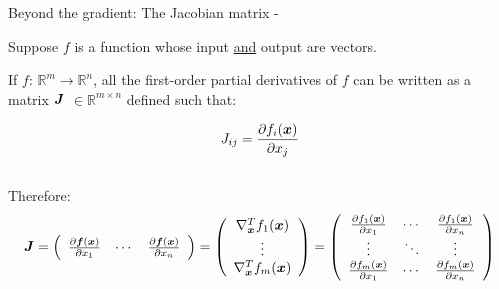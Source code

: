
\begin{frame}[t,allowframebreaks]{
    Beyond the gradient: The Jacobian matrix -}

    Suppose $f$ is a function 
    whose input \underline{and} output are vectors.\\
    \vspace{0.2cm}

    If $f$: $\mathbb{R}^m \rightarrow \mathbb{R}^n$,
    all the first-order partial derivatives of $f$ can be written 
    as a matrix $\boldsymbol{J}$ $\in \mathbb{R}^{m \times n}$
    defined such that:

    \begin{equation}
        J_{ij} = 
        \frac{\partial f_{i}(\boldsymbol{x})}{\partial x_j}
        \label{eq:jacobian_1}
    \end{equation}\\

    Therefore: 
    \begin{equation}
        \boldsymbol{J} = 
        \left(
            \begin{array}{ccc}
            \frac{\partial \boldsymbol{f}(\boldsymbol{x})}{\partial x_1} & 
            \cdots & 
            \frac{\partial \boldsymbol{f}(\boldsymbol{x})}{\partial x_n} \\ 
            \end{array}
        \right) =
        \left(
            \begin{array}{c}
            \nabla_{\boldsymbol{x}}^T f_{1}(\boldsymbol{x}) \\
            \vdots \\
            \nabla_{\boldsymbol{x}}^T f_{m}(\boldsymbol{x}) \\
            \end{array}
        \right) =
        \left(
            \begin{array}{ccc}
            \frac{\partial f_{1}(\boldsymbol{x})}{\partial x_1} & 
            \cdots & 
            \frac{\partial f_{1}(\boldsymbol{x})}{\partial x_n} \\ 
            \vdots &
            \ddots & 
            \vdots \\
            \frac{\partial f_{m}(\boldsymbol{x})}{\partial x_1} & 
            \cdots & 
            \frac{\partial f_{m}(\boldsymbol{x})}{\partial x_n} \\ 
            \end{array}
        \right)
        \label{eq:jacobian_2}
    \end{equation}\\


\end{frame}
